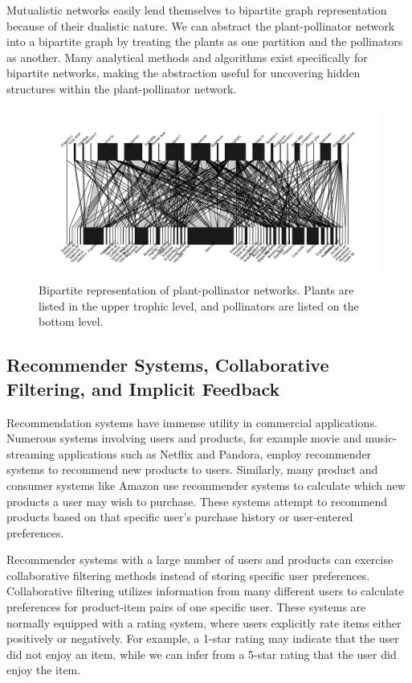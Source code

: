 \documentclass[twocolumn]{article}
\begin{document}
Mutualistic networks easily lend themselves to bipartite graph representation because of their dualistic nature.
We can abstract the plant-pollinator network into a bipartite graph by treating the 
plants as one partition and the pollinators as another. Many analytical methods and algorithms
exist specifically for bipartite networks\cite{bipartite}, making the abstraction useful for uncovering
hidden structures within the plant-pollinator network.
\begin{figure}
  \caption{Bipartite representation of plant-pollinator networks. Plants are listed in the upper trophic level, and
  pollinators are listed on the bottom level.}
  \centering
  \includegraphics[scale=0.65]{bipartite.pdf}
\end{figure}

\subsection{Recommender Systems, Collaborative Filtering, and Implicit Feedback}
Recommendation systems have immense utility in commercial applications. 
Numerous systems involving users and products, for example movie and 
music-streaming applications such as Netflix and Pandora, employ recommender systems
to recommend new products to users. Similarly, many product and consumer systems 
like Amazon use recommender systems to calculate which new products a user may 
wish to purchase.
These systems attempt to recommend products based on that specific user's purchase
history or user-entered preferences. 

Recommender systems with a large number of users and 
products can exercise 
collaborative filtering methods instead of storing specific  user preferences.
Collaborative filtering utilizes information from 
many different users to calculate preferences for product-item pairs of one specific user. 
These systems are normally equipped with a rating system, 
where users explicitly rate items either positively or negatively. For example, a 1-star rating
may indicate that the user did not enjoy an item, while we can infer from a 5-star rating that
the user did enjoy the item.
\end{document}
